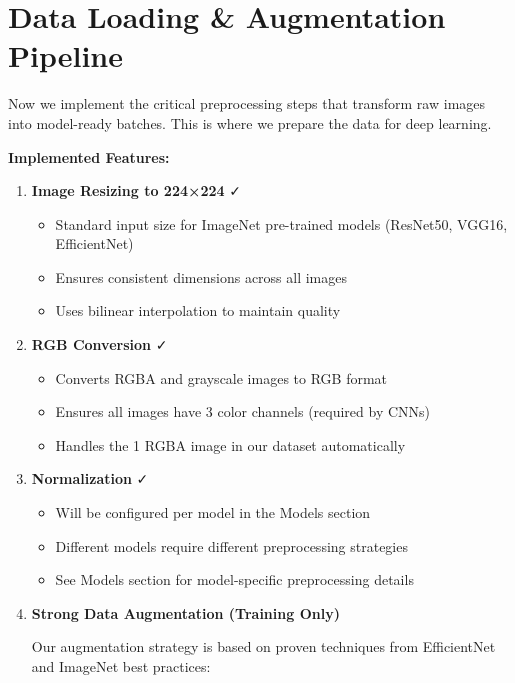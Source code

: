 \documentclass[
  letterpaper,
  DIV=11,
  numbers=noendperiod]{scrartcl}
\providecommand{\tightlist}{%
  \setlength{\itemsep}{0pt}\setlength{\parskip}{0pt}}
\begin{document}
\section{Data Loading \& Augmentation
Pipeline}\label{data-loading-augmentation-pipeline}

Now we implement the critical preprocessing steps that transform raw
images into model-ready batches. This is where we prepare the data for
deep learning.

\textbf{Implemented Features:}

\begin{enumerate}
\def\labelenumi{\arabic{enumi}.}
\item
  \textbf{Image Resizing to 224×224} ✓

  \begin{itemize}
  \tightlist
  \item
    Standard input size for ImageNet pre-trained models (ResNet50,
    VGG16, EfficientNet)
  \item
    Ensures consistent dimensions across all images
  \item
    Uses bilinear interpolation to maintain quality
  \end{itemize}
\item
  \textbf{RGB Conversion} ✓

  \begin{itemize}
  \tightlist
  \item
    Converts RGBA and grayscale images to RGB format
  \item
    Ensures all images have 3 color channels (required by CNNs)
  \item
    Handles the 1 RGBA image in our dataset automatically
  \end{itemize}
\item
  \textbf{Normalization} ✓

  \begin{itemize}
  \tightlist
  \item
    Will be configured per model in the Models section
  \item
    Different models require different preprocessing strategies
  \item
    See Models section for model-specific preprocessing details
  \end{itemize}
\item
  \textbf{Strong Data Augmentation (Training Only)}

  Our augmentation strategy is based on proven techniques from
  EfficientNet and ImageNet best practices:


\end{enumerate}
\end{document}
